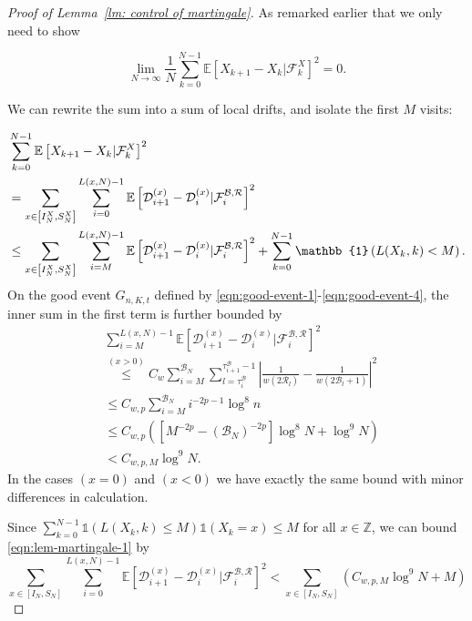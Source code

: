 \documentclass[twoside,12pt, a4paper, final]{article}
\numberwithin{equation}{section}
\theoremstyle{remark}
\begin{document}
	\begin{proof}[Proof of Lemma~\ref{lm: control of martingale}]
		As remarked earlier that we only need to show
		
		\[
		\lim_{N \to \infty } \frac{1}{N} \sum_{k = 0}^{N-1} \mathbb{E}\left[ X_{k+1} - X_k | \mathcal{F}_k^X \right]^2 = 0
		.\] 
		
		
		We can rewrite the sum into a sum of local drifts, and isolate the first $M$ visits:
		
		\begin{align}
			&\sum_{k = 0}^{N-1} \mathbb{E}\left[ X_{k+1} - X_k | \mathcal{F}_k^X \right]^2
			\notag
			\\
			&= \sum_{x \in \left[ I_N^X, S_N^X \right]} \sum_{i = 0}^{L(x, N) - 1} \mathbb{E}\left[ \mathcal{D}_{i+1}^{(x)} - \mathcal{D}_i^{(x)} | \mathcal{F}_{i}^{\mathcal{B}, \mathcal{R}} \right]^2  
			\notag
			\\
			&\le  \sum_{x \in \left[ I_N^X, S_N^X \right]} \sum_{i = M}^{L(x,N) - 1} \mathbb{E}\left[ \mathcal{D}_{i+1}^{(x)} - \mathcal{D}_i^{(x)} | \mathcal{F}_{i}^{\mathcal{B}, \mathcal{R}} \right]^2  + 
			\sum_{k = 0}^{N - 1} \mathbb{1}\left( L(X_k, k) <  M \right) 
			\label{eqn:lem-martingale-1}
			.\end{align}
		On the good event $G_{n, K, t}$ defined by \eqref{eqn:good-event-1}-\eqref{eqn:good-event-4},
		the inner sum in the first term is further bounded by
		\begin{align*}
			&\sum_{i =M}^{ L(x, N) - 1} \mathbb{E}\left[ \mathcal{D}_{i+1}^{(x)} - \mathcal{D}_i^{(x)} | \mathcal{F}_{i}^{\mathcal{B}, \mathcal{R}} \right]^2\\
			&\stackrel{(x > 0)}{\le} C_w \sum_{i = M}^{\mathcal{B}_N} \sum_{l = \tau_i^{\mathcal{B}}}^{\tau_{i+1}^{\mathcal{B}}-1} 
			\left| \frac{1}{w(2 \mathcal{R}_l)} - \frac{1}{w\left( 2 \mathcal{B}_l + 1 \right) } \right|^2 \\
			&\le C_{w, p} \sum_{i = M}^{\mathcal{B}_N} i^{- 2 p - 1} \log^8 n  \\
			&\le C_{w, p} \left(\left[ M^{- 2 p} -\left(  \mathcal{B}_N \right) ^{- 2 p} \right] \log^8 N + \log^9 N\right)  \\
			&< C_{w, p, M} \log^9 N
			.
		\end{align*}
		In the cases $(x=0)$ and $(x < 0)$ we have exactly the same bound with minor differences in calculation.
		
		Since $\sum_{k = 0}^{N-1} \mathbb{1}\left( L(X_k, k) \le M \right) \mathbb{1}(X_k = x) \le  M$ for all $x \in \mathbb{Z}$, we can bound \eqref{eqn:lem-martingale-1} by
		\begin{equation*}
			\sum_{x \in \left[ I_N, S_N \right]} \sum_{i = 0}^{L(x,N) - 1} \mathbb{E}\left[ \mathcal{D}_{i+1}^{(x)} - \mathcal{D}_i^{(x)} | \mathcal{F}_{i}^{\mathcal{B}, \mathcal{R}} \right]^2 
			< \sum_{x \in \left[ I_N, S_N \right]} (C_{w, p, M} \log^9 N +M )
		\end{equation*}
		

\end{proof}
\end{document}
